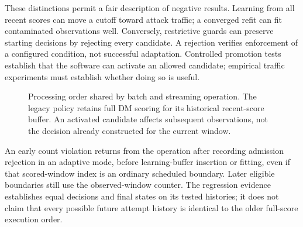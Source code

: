 These distinctions permit a fair description of negative results.
Learning from all recent scores can move a cutoff toward attack traffic;
a converged refit can fit contaminated observations well. Conversely,
restrictive guards can preserve starting decisions by rejecting every
candidate. A rejection verifies enforcement of a configured condition,
not successful adaptation. Controlled promotion tests establish that the
software can activate an allowed candidate; empirical traffic experiments
must establish whether doing so is useful.

\begin{figure}[tbp]
\centering
{}
\caption{Processing order shared by batch and streaming operation. The legacy
policy retains full DM scoring for its historical recent-score buffer. An
activated candidate affects subsequent observations, not the decision already
constructed for the current window.}
\label{fig:window-procedure}
\end{figure}

An early count violation returns from the operation after recording
admission rejection in an adaptive mode, before learning-buffer insertion
or fitting, even if that scored-window index is an
ordinary scheduled boundary. Later eligible boundaries still use
the observed-window counter. The regression evidence establishes
equal decisions and final states on its tested histories; it does
not claim that every possible future attempt history is identical
to the older full-score execution order.

